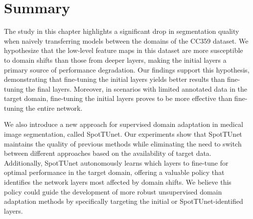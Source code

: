 \section{Summary}

The study in this chapter highlights a significant drop in segmentation quality when naively transferring models between the domains of the CC359 dataset. We hypothesize that the low-level feature maps in this dataset are more susceptible to domain shifts than those from deeper layers, making the initial layers a primary source of performance degradation. Our findings support this hypothesis, demonstrating that fine-tuning the initial layers yields better results than fine-tuning the final layers. Moreover, in scenarios with limited annotated data in the target domain, fine-tuning the initial layers proves to be more effective than fine-tuning the entire network.

We also introduce a new approach for supervised domain adaptation in medical image segmentation, called SpotTUnet. Our experiments show that SpotTUnet maintains the quality of previous methods while eliminating the need to switch between different approaches based on the availability of target data. Additionally, SpotTUnet autonomously learns which layers to fine-tune for optimal performance in the target domain, offering a valuable policy that identifies the network layers most affected by domain shifts. We believe this policy could guide the development of more robust unsupervised domain adaptation methods by specifically targeting the initial or SpotTUnet-identified layers.


